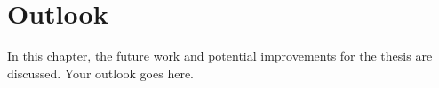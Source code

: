 \chapter{Outlook}
\label{Chapter::Outlook}
In this chapter, the future work and potential improvements for the thesis are discussed.
Your outlook goes here.
